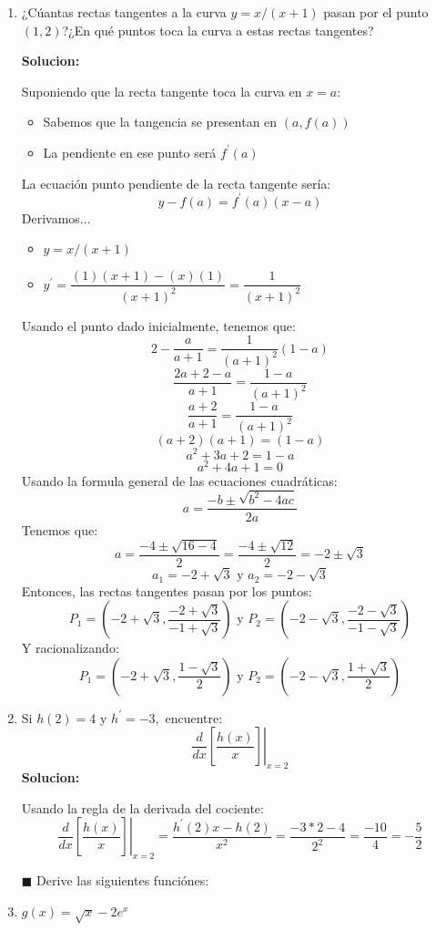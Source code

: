 \documentclass{article}
\begin{document}
\begin{enumerate}[start=5, label=\textbf{\arabic*.}]
    \item ¿Cúantas rectas tangentes a la curva $y = x/(x+1)$ pasan por el punto $(1,2)$?¿En qué puntos toca la curva a estas rectas tangentes?
    
    \vspace{0.5em}
    \textbf{Solucion: } 

    Suponiendo que la recta tangente toca la curva en $x=a$:
    \begin{itemize}
        \item Sabemos que la tangencia se presentan en $(a,f(a))$
        \item La pendiente en ese punto será $f^{\prime}(a)$
    \end{itemize}
    La ecuación punto pendiente de la recta tangente sería:
    \[
        y - f(a) = f^{\prime}(a)(x-a)
    \]
    Derivamos...
    \begin{itemize}    
        \item  $y = x/(x+1)$
        \item  $y^{\prime} = \dfrac{(1)(x+1) - (x)(1)}{(x+1)^2} = \dfrac{1}{(x+1)^2}$
    \end{itemize}
    Usando el punto dado inicialmente, tenemos que:
    \[
        2 - \dfrac{a}{a+1} = \dfrac{1}{(a+1)^2}(1-a)
    \]
    \[
        \dfrac{2a+2-a}{a+1} = \dfrac{1-a}{(a+1)^2}
    \]
    \[
        \dfrac{a+2}{a+1} = \dfrac{1-a}{(a+1)^2}
    \]
    \[
        (a+2)(a+1) = (1-a)
    \]
    \[
        a^2 + 3a + 2 = 1-a
    \]
    \[
        a^2 + 4a + 1 = 0
    \]
    Usando la formula general de las ecuaciones cuadráticas:
    \[
        a = \dfrac{-b \pm \sqrt{b^2 - 4ac}}{2a}
    \]
    Tenemos que:
    \[
        a = \dfrac{-4 \pm \sqrt{16 - 4}}{2} = \dfrac{-4 \pm \sqrt{12}}{2} = -2 \pm \sqrt{3}
    \]
    \[
        a_1 = -2 + \sqrt{3} \text{ y } a_2 = -2 - \sqrt{3}
    \]
    Entonces, las rectas tangentes pasan por los puntos:
    \[
        P_1 = (-2+\sqrt{3}, \dfrac{-2+\sqrt{3}}{-1+\sqrt{3}}) \text{ y }  P_2 = (-2-\sqrt{3}, \dfrac{-2-\sqrt{3}}{-1-\sqrt{3}})
    \]
    Y racionalizando:
    \[
        P_1 = (-2+\sqrt{3},  \dfrac{1-\sqrt{3}}{2}) \text{ y }  P_2 = (-2-\sqrt{3}, \dfrac{1+\sqrt{3}}{2})
    \]
    \vspace{1em}
    \item Si $h(2) = 4$ y $h^{\prime}  = -3,$ encuentre:
    \[
        \left.\dfrac{d}{dx}\left[\dfrac{h(x)}{x}\right]\right|_{x=2}
    \]
    \textbf{Solucion: }

    Usando la regla de la derivada del cociente:
    \[
        \left.\dfrac{d}{dx}\left[\dfrac{h(x)}{x}\right]\right|_{x=2} = \dfrac{h^{\prime}(2)x - h(2)}{x^2} = \dfrac{-3*2 - 4}{2^2} = \dfrac{-10}{4} = -\dfrac{5}{2}
    \]
    \par\vspace{3em}
    $\blacksquare$ Derive las siguientes funciónes:
    \vspace{1em}
    \item $g(x) = \sqrt{x}-2e^x$
    

\end{enumerate}
\end{document}
